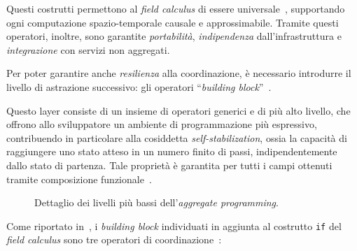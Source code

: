 Questi costrutti permettono al \emph{field calculus} di essere universale~\cite{10.1007/978-3-319-92408-3_1},
supportando ogni computazione spazio-temporale causale e approssimabile.
Tramite questi operatori, inoltre, sono garantite \emph{portabilità}, \emph{indipendenza} dall'infrastruttura e \emph{integrazione} con servizi non aggregati.

Per poter garantire anche \emph{resilienza} alla coordinazione, è necessario introdurre il livello di astrazione successivo:
gli operatori ``\emph{building block}''~\cite{BV-FOCAS2014}.

Questo layer consiste di un insieme di operatori generici e di più alto livello, che offrono allo sviluppatore un ambiente di programmazione più espressivo,
contribuendo in particolare alla cosiddetta \emph{self-stabilization}, ossia la capacità di raggiungere uno stato atteso in un numero finito di passi,
indipendentemente dallo stato di partenza.
Tale proprietà è garantita per tutti i campi ottenuti tramite composizione funzionale~\cite{BV-FOCAS2014}.

\begin{figure}[htbp]
  \centering
  \caption{Dettaglio dei livelli più bassi dell'\emph{aggregate programming}.}%
  \label{fig:stack-detail}
\end{figure}

Come riportato in~, i \emph{building block} individuati in aggiunta al costrutto \texttt{if} del \emph{field calculus} sono tre operatori di coordinazione~\cite{7274429,BV-FOCAS2014}:


